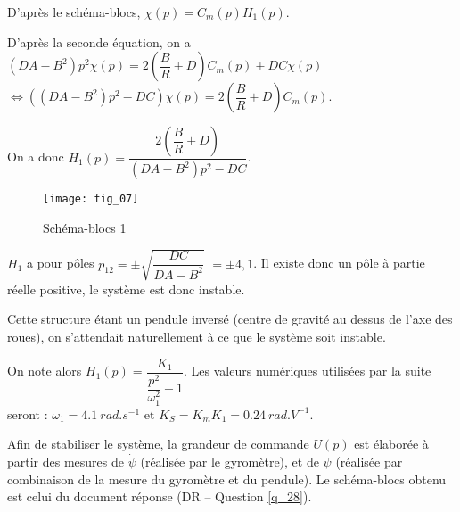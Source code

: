 \ifprof
\begin{corrige}
D'après le schéma-blocs, $\chi(p) =C_m(p)H_1(p)$.

D'après la seconde équation, on a 
$\left(DA -B^2 \right) p^2{\chi}(p) = 2\left(\dfrac{B}{R}+D\right)C_m(p) + DC\chi(p)$
$ \Leftrightarrow \left(\left(DA -B^2 \right) p^2 -  DC \right){\chi}(p) = 2\left(\dfrac{B}{R}+D\right)C_m(p) $.

On a donc $H_1(p)=\dfrac{ 2\left(\dfrac{B}{R}+D\right)}{\left(DA -B^2 \right) p^2 -  DC}$.



\end{corrige}
\else
\fi

\ifprof
\else
\begin{figure}[H]
\centering
\texttt{[image: fig\_07]}
\caption{Schéma-blocs 1 \label{fig_07}}
\end{figure}
\fi


\ifprof
\begin{corrige}
$H_1$ a pour pôles $p_{12}=\pm\sqrt{\dfrac{DC}{DA-B^2}}$ $=\pm 4,1$. Il existe donc un pôle à partie réelle positive, le système est donc instable. 

Cette structure étant un pendule inversé (centre de gravité au dessus de l'axe des roues), on s'attendait naturellement à ce que le système soit instable.

\end{corrige}
\else
\fi


\ifprof
\else
On note alors $H_1(p)=\dfrac{K_1}{\dfrac{p^2}{\omega_1^2}-1}$. Les valeurs numériques utilisées par la suite seront : $\omega_1=\SI{4,1}{rad.s^{-1}}$  et $K_S=K_mK_1 = \SI{0,24}{rad.V^{-1}}$.

Afin de stabiliser le système, la grandeur de commande $U(p)$ est élaborée à partir des mesures de $\dot{\psi}$ (réalisée par le gyromètre), et de ${\psi}$  (réalisée par combinaison de la mesure du gyromètre et du pendule).  Le schéma-blocs obtenu est celui du document réponse (DR -- Question \ref{q_28}).
\fi


